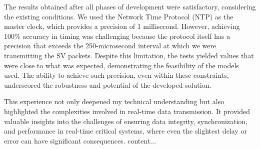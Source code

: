 The results obtained after all phases of development were satisfactory, considering the existing conditions. We used the Network Time Protocol (NTP) as the master clock, which provides a precision of 1 millisecond. However, achieving 100\% accuracy in timing was challenging because the protocol itself has a precision that exceeds the 250-microsecond interval at which we were transmitting the SV packets. Despite this limitation, the tests yielded values that were close to what was expected, demonstrating the feasibility of the models used. The ability to achieve such precision, even within these constraints, underscored the robustness and potential of the developed solution.

This experience not only deepened my technical understanding but also highlighted the complexities involved in real-time data transmission. It provided valuable insights into the challenges of ensuring data integrity, synchronization, and performance in real-time critical systems, where even the slightest delay or error can have significant consequences.
	content...
